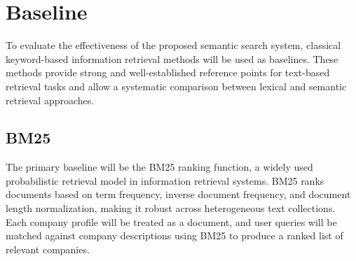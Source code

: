 \documentclass[a4paper]{scrartcl}
\begin{document}



\section{Baseline}
To evaluate the effectiveness of the proposed semantic search system, classical keyword-based information retrieval methods will be used as baselines. These methods provide strong and well-established reference points for text-based retrieval tasks and allow a systematic comparison between lexical and semantic retrieval approaches.

\subsection{BM25}

The primary baseline will be the BM25 ranking function, a widely used probabilistic retrieval model in information retrieval systems. BM25 ranks documents based on term frequency, inverse document frequency, and document length normalization, making it robust across heterogeneous text collections. Each company profile will be treated as a document, and user queries will be matched against company descriptions using BM25 to produce a ranked list of relevant companies.
\end{document}
